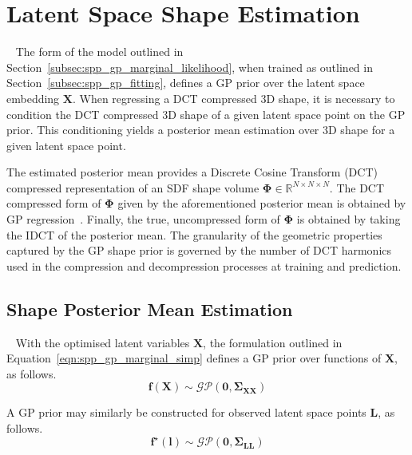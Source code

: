 \section{Latent Space Shape Estimation}
~\label{sec:spp_latent_shape_est}
The form of the model outlined in Section~\ref{subsec:spp_gp_marginal_likelihood},
when trained as outlined in Section~\ref{subsec:spp_gp_fitting}, defines a GP prior 
over the latent space embedding \( \bm{X} \). When regressing a DCT compressed 3D shape, it is 
necessary to condition the DCT compressed 3D shape of a given latent space point on the GP prior. 
This conditioning yields a posterior mean estimation over 3D shape for a given latent space point.

The estimated posterior mean provides a Discrete Cosine Transform (DCT) compressed representation 
of an SDF shape volume \( \bm{\Phi} \in \mathbb{R}^{N \times N \times N} \). The DCT compressed form 
of \( \bm{\Phi} \) given by the aforementioned posterior mean is obtained by GP regression~\cite{GPML}. 
Finally, the true, uncompressed form of \( \bm{\Phi} \) is obtained by taking the IDCT of the posterior mean. 
The granularity of the geometric properties captured by the GP shape prior is governed by the number of DCT 
harmonics used in the compression and decompression processes at training and prediction.

\subsection{Shape Posterior Mean Estimation}
~\label{subsec:spp_pos_mean_est}
With the optimised latent variables \( \bm{X} \), the formulation outlined in 
Equation~\ref{eqn:spp_gp_marginal_simp} defines a GP prior 
over functions of \( \bm{X} \), as follows.
\begin{equation}
  \label{eqn:gp_prior}
  \bm{f}(\bm{X}) \sim \mathcal{GP}(\bm{0}, \bm{\Sigma}_{\bm{XX}})
\end{equation}

A GP prior may similarly be constructed for observed latent 
space points \( \bm{L} \), as follows.
\begin{equation}
  \label{eqn:gp_prior_latent}
  \bm{f}^{\star}(\bm{l}) \sim \mathcal{GP}(\bm{0}, \bm{\Sigma}_{\bm{LL}})
\end{equation}

